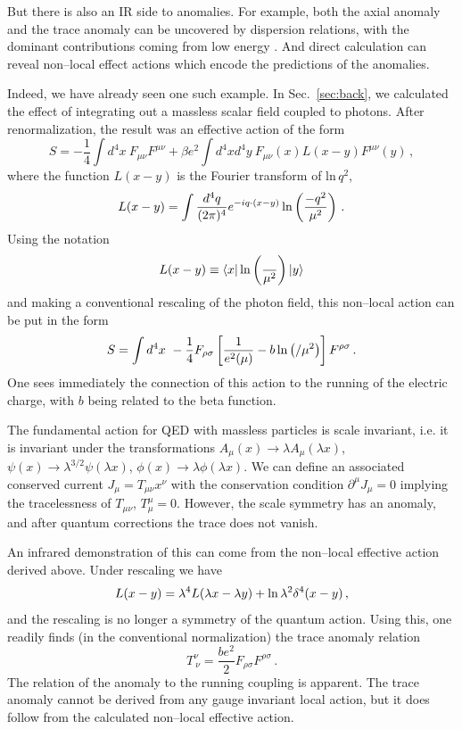 \documentclass[11pt,a4paper]{article}
\newcommand{\be}{\begin{equation}}
\newcommand{\ee}{\end{equation}}
\renewcommand{\ln}{\mathop{\rm ln}\nolimits}
\begin{document}
But there is also an IR side to anomalies. For example, both the axial anomaly and the trace anomaly can be uncovered by dispersion relations, with the dominant contributions coming from low energy \cite{Dolgov:1971ri, Horejsi:1985qu, Horejsi:1997yn}. And direct calculation can reveal non--local effect actions which encode the predictions of the anomalies.

Indeed, we have already seen one such example. In Sec.~\ref{sec:back}, we calculated the effect of integrating out a massless scalar field coupled to photons. After renormalization, the result was an effective action of the form
\be
S=-\frac{1}{4}\int d^4x~  F_{\mu\nu}F^{\mu\nu}+\beta e^2 \int d^4x d^4y~
F_{\mu \nu}(x)L(x-y)F^{\mu \nu}(y)\,,
\ee
where the function $L(x-y)$ is the Fourier transform of $\text{ln}\, q^2$,
\begin{equation}
L(x-y) = \int \frac{d^4q}{(2\pi)^4} e^{-iq\cdot (x-y)} \ln \left(\frac{-q^2}{\mu^2}\right)\,.
\label{logbox1}
\end{equation}
Using the notation
\begin{equation}
L(x-y) \equiv \langle x|\ln \left(\frac{\square}{\mu^2}\right)|y\rangle
\label{logbox2}
\end{equation}
and making a conventional rescaling of the photon field, this non--local action can be put in the form
\begin{equation}
S = \int d^4x ~-\frac14 F_{\rho\sigma} \left[\frac{1}{e^2(\mu)} - b \ln \left({\square}/{\mu^2}\right)\right]F^{\rho\sigma} \,.
\label{quasilocal}
\end{equation}
One sees immediately the connection of this action to the running of the electric charge, with $b$ being related to the beta function.

The fundamental action for QED with massless particles is scale invariant, i.e. it is invariant under the transformations  $A_\mu(x) \to \lambda A_\mu(\lambda x)$, $\psi(x)\to \lambda^{3/2}\psi(\lambda x)$, $\phi(x)\to \lambda \phi(\lambda x)$. We can define an associated conserved current $J_\mu = T_{\mu\nu}x^\nu$ with the conservation condition $\partial^\mu J_\mu=0$ implying the tracelessness of $T_{\mu\nu}$, $T^\mu_\mu=0$.  However, the scale symmetry has an anomaly, and after quantum corrections the trace does not vanish.

An infrared demonstration of this can come from the non--local effective action derived above. Under
rescaling we have
\begin{equation}
L(x-y) =\lambda^4 L(\lambda x - \lambda y) +\ln \lambda^2 \delta^4( x - y)\,,
\end{equation}
and the rescaling is no longer a symmetry of the quantum action. Using this, one readily finds (in the conventional normalization) the trace anomaly relation
\begin{equation}
T^\nu_{~\nu}  = \frac{be^2}{2}F_{\rho\sigma}F^{\rho\sigma}  \,.
\end{equation}
The relation of the anomaly to the running coupling is apparent. The trace anomaly cannot be derived from any gauge invariant local action, but it does follow from the calculated non--local effective action.
\end{document}
